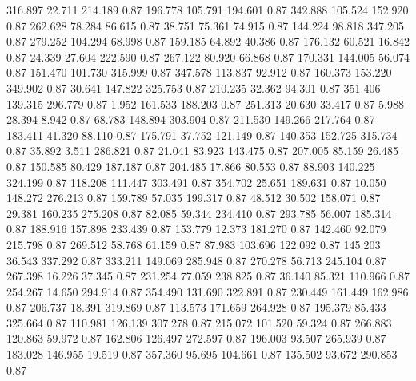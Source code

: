  316.897   22.711  214.189         0.87
 196.778  105.791  194.601         0.87
 342.888  105.524  152.920         0.87
 262.628   78.284   86.615         0.87
  38.751   75.361   74.915         0.87
 144.224   98.818  347.205         0.87
 279.252  104.294   68.998         0.87
 159.185   64.892   40.386         0.87
 176.132   60.521   16.842         0.87
  24.339   27.604  222.590         0.87
 267.122   80.920   66.868         0.87
 170.331  144.005   56.074         0.87
 151.470  101.730  315.999         0.87
 347.578  113.837   92.912         0.87
 160.373  153.220  349.902         0.87
  30.641  147.822  325.753         0.87
 210.235   32.362   94.301         0.87
 351.406  139.315  296.779         0.87
   1.952  161.533  188.203         0.87
 251.313   20.630   33.417         0.87
   5.988   28.394    8.942         0.87
  68.783  148.894  303.904         0.87
 211.530  149.266  217.764         0.87
 183.411   41.320   88.110         0.87
 175.791   37.752  121.149         0.87
 140.353  152.725  315.734         0.87
  35.892    3.511  286.821         0.87
  21.041   83.923  143.475         0.87
 207.005   85.159   26.485         0.87
 150.585   80.429  187.187         0.87
 204.485   17.866   80.553         0.87
  88.903  140.225  324.199         0.87
 118.208  111.447  303.491         0.87
 354.702   25.651  189.631         0.87
  10.050  148.272  276.213         0.87
 159.789   57.035  199.317         0.87
  48.512   30.502  158.071         0.87
  29.381  160.235  275.208         0.87
  82.085   59.344  234.410         0.87
 293.785   56.007  185.314         0.87
 188.916  157.898  233.439         0.87
 153.779   12.373  181.270         0.87
 142.460   92.079  215.798         0.87
 269.512   58.768   61.159         0.87
  87.983  103.696  122.092         0.87
 145.203   36.543  337.292         0.87
 333.211  149.069  285.948         0.87
 270.278   56.713  245.104         0.87
 267.398   16.226   37.345         0.87
 231.254   77.059  238.825         0.87
  36.140   85.321  110.966         0.87
 254.267   14.650  294.914         0.87
 354.490  131.690  322.891         0.87
 230.449  161.449  162.986         0.87
 206.737   18.391  319.869         0.87
 113.573  171.659  264.928         0.87
 195.379   85.433  325.664         0.87
 110.981  126.139  307.278         0.87
 215.072  101.520   59.324         0.87
 266.883  120.863   59.972         0.87
 162.806  126.497  272.597         0.87
 196.003   93.507  265.939         0.87
 183.028  146.955   19.519         0.87
 357.360   95.695  104.661         0.87
 135.502   93.672  290.853         0.87
